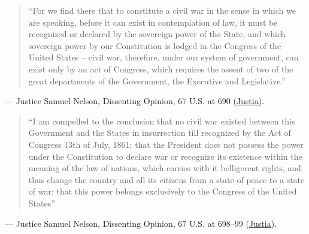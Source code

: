 \documentclass[12pt]{article}
\begin{document}
\begin{quote}
``For we find there that to constitute a civil war in the sense in which we are speaking, before it can exist in contemplation of law, it must be recognized or declared by the sovereign power of the State, and which sovereign power by our Constitution is lodged in the Congress of the United States -- civil war, therefore, under our system of government, can exist only by an act of Congress, which requires the assent of two of the great departments of the Government, the Executive and Legislative.''
\end{quote}
\noindent --- Justice Samuel Nelson, Dissenting Opinion, 67 U.S. at 690 (\href{https://supreme.justia.com/cases/federal/us/67/635/}{Justia}).

\begin{quote}
``I am compelled to the conclusion that no civil war existed between this Government and the States in insurrection till recognized by the Act of Congress 13th of July, 1861; that the President does not possess the power under the Constitution to declare war or recognize its existence within the meaning of the law of nations, which carries with it belligerent rights, and thus change the country and all its citizens from a state of peace to a state of war; that this power belongs exclusively to the Congress of the United States''
\end{quote}
\noindent --- Justice Samuel Nelson, Dissenting Opinion, 67 U.S. at 698--99 (\href{https://supreme.justia.com/cases/federal/us/67/635/}{Justia}).
\end{document}
